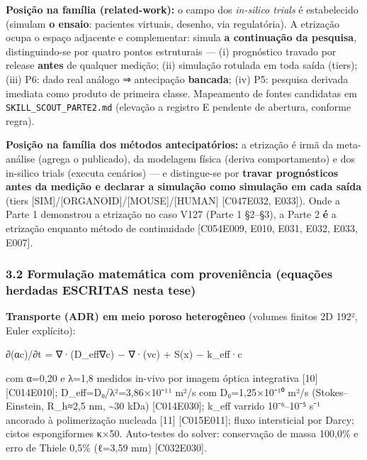\documentclass[
  10pt,
]{article}
\begin{document}
\textbf{Posição na família (related-work):} o campo dos \emph{in-silico
trials} é estabelecido (simulam \textbf{o ensaio}: pacientes virtuais,
desenho, via regulatória). A etrização ocupa o espaço adjacente e
complementar: simula \textbf{a continuação da pesquisa}, distinguindo-se
por quatro pontos estruturais --- (i) prognóstico travado por release
\textbf{antes} de qualquer medição; (ii) simulação rotulada em toda
saída (tiers); (iii) P6: dado real análogo ⇒ antecipação
\textbf{bancada}; (iv) P5: pesquisa derivada imediata como produto de
primeira classe. Mapeamento de fontes candidatas em
\texttt{SKILL\_SCOUT\_PARTE2.md} (elevação a registro E pendente de
abertura, conforme regra).

\textbf{Posição na família dos métodos antecipatórios:} a etrização é
irmã da meta-análise (agrega o publicado), da modelagem física (deriva
comportamento) e dos in-silico trials (executa cenários) --- e
distingue-se por \textbf{travar prognósticos antes da medição e declarar
a simulação como simulação em cada saída} (tiers
{[}SIM{]}/{[}ORGANOID{]}/{[}MOUSE{]}/{[}HUMAN{]} {[}C047\textbar E032,
E033{]}). Onde a Parte 1 demonstrou a etrização no caso V127 (Parte 1
§2--§3), a Parte 2 \textbf{é} a etrização enquanto método de
continuidade {[}C054\textbar E009, E010, E031, E032, E033, E007{]}.

\hypertarget{formulauxe7uxe3o-matemuxe1tica-com-proveniuxeancia-equauxe7uxf5es-herdadas-escritas-nesta-tese}{%
\subsubsection{3.2 Formulação matemática com proveniência (equações
herdadas ESCRITAS nesta
tese)}\label{formulauxe7uxe3o-matemuxe1tica-com-proveniuxeancia-equauxe7uxf5es-herdadas-escritas-nesta-tese}}

\textbf{Transporte (ADR) em meio poroso heterogêneo} (volumes finitos 2D
192², Euler explícito):

∂(αc)/∂t = ∇·(D\_eff∇c) − ∇·(vc) + S(x) − k\_eff·c

com α=0,20 e λ=1,8 medidos in-vivo por imagem óptica integrativa
{[}10{]} {[}C014\textbar E010{]}; D\_eff=D₀/λ²=3,86×10⁻¹¹ m²/s com
D₀=1,25×10⁻¹⁰ m²/s (Stokes--Einstein, R\_h≈2,5 nm, \textasciitilde30
kDa) {[}C014\textbar E030{]}; k\_eff varrido 10⁻⁶--10⁻⁵ s⁻¹ ancorado à
polimerização nucleada {[}11{]} {[}C015\textbar E011{]}; fluxo
intersticial por Darcy; cistos espongiformes κ×50. Auto-testes do
solver: conservação de massa 100,0\% e erro de Thiele 0,5\% (ℓ=3,59 mm)
{[}C032\textbar E030{]}.
\end{document}
